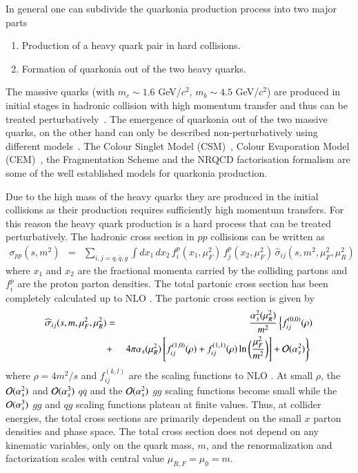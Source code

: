 In general one can subdivide the quarkonia production process into two major parts

\begin{enumerate}
\item Production of a heavy quark pair in hard collisions.
\item Formation of quarkonia out of the two heavy quarks.
\end{enumerate}


The massive quarks (with $m_c\sim 1.6$ GeV/$c^2$, $m_b\sim 4.5$ GeV/$c^2$) are produced
in initial stages in hadronic collision with high momentum transfer and thus
can be treated perturbatively~\cite{Nason:1989zy}. The emergence of quarkonia
out of the two massive quarks, on the other hand can only be described non-perturbatively using different
models~\cite{Bodwin:1994jh,Brambilla:2014jmp}.
The Colour Singlet Model (CSM)~\cite{Einhorn:1975ua,Berger:1980ni},
Colour Evaporation Model (CEM)~\cite{Fritzsch:1977ay,Amundson:1995em}, the Fragmentation Scheme and 
the NRQCD factorisation formalism are some of the well established models for quarkonia production.


Due to the high mass of the heavy quarks they are produced in the initial
collisions as their production requires sufficiently high momentum 
transfers. For this reason the heavy quark production
is a hard process that can be treated perturbatively.
The hadronic cross section in $pp$ collisions can
be written as
\begin{eqnarray}
\sigma_{pp}(s,m^2) & = & \sum_{i,j = q, \overline q, g} 
\int dx_1 \, dx_2 \, 
f_i^p (x_1,\mu_F^2) \,
f_j^p(x_2,\mu_F^2) \, \widehat{\sigma}_{ij}(s,m^2,\mu_F^2,\mu_R^2)
\label{sigpp}
\end{eqnarray}
where $x_1$ and $x_2$ are the fractional momenta carried by the colliding
partons and $f_i^p$ are the proton parton densities.
The total partonic cross section has been completely calculated up to NLO
\cite{Nason:1987xz,Nason:1989zy}. The partonic cross section is given by
\begin{eqnarray}
\widehat{\sigma}_{ij}(s,m,\mu_F^2,\mu_R^2) & = & 
\frac{\alpha_s^2(\mu_R^2)}{m^2}
\left\{ f^{(0,0)}_{ij}(\rho) \right. \nonumber \\
 & + & \left. 4\pi \alpha_s(\mu_R^2) \left[f^{(1,0)}_{ij}(\rho) + 
f^{(1,1)}_{ij}(\rho)\ln\bigg(\frac{\mu_F^2}{m^2} \bigg) \right] 
+ {\cal O}(\alpha_s^2) \right\}
\,\, 
\label{sigpart}
\end{eqnarray}
where $\rho = 4m^2/s$ and 
$f_{ij}^{(k,l)}$ are the scaling functions to NLO \cite{Nason:1987xz,Nason:1989zy}. 
At small $\rho$, the ${\cal O}(\alpha_s^2)$ and ${\cal O}(\alpha_s^3)$
$q \overline q$ and the ${\cal O}(\alpha_s^2)$ $gg$ scaling functions 
become small while the ${\cal O}(\alpha_s^3)$ $gg$ and $qg$ scaling functions
plateau at finite values.  Thus, at collider energies, the total cross sections
are primarily dependent on the small $x$ parton densities and phase space.
The total cross section does not depend on any kinematic variables, 
only on the quark mass, $m$, and the renormalization and factorization scales with central
value $\mu_{R,F} =\mu_0 = m$.


